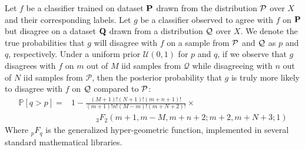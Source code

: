 \begin{theorem}
    \label{th:bayes-shift}
    Let $f$ be a classifier trained on dataset $\mathbf{P}$ drawn from the distribution $\mathcal{P}$ over $X$ and their corresponding labels.
    Let $g$ be a classifier observed to agree with $f$ on $\mathbf{P}$ but disagree on a dataset $\mathbf{Q}$ drawn from a distribution $\mathcal{Q}$ over $X$.
    We denote the true probabilities that $g$ will disagree with $f$ on a sample from $\mathcal{P}$ and $\mathcal{Q}$ as $p$ and $q$, respectively.
    Under a uniform prior $\mathcal{U}(0,1)$ for $p$ and $q$,
    if we observe that $g$ disagrees with $f$ on $m$ out of $M$ iid samples from $\mathcal{Q}$ while disagreeing with $n$ out of $N$ iid samples from $\mathcal{P}$, then
    the posterior probability that $g$ is truly more likely to disagree with $f$ on $\mathcal{Q}$ compared to $\mathcal{P}$:
    \begin{align}
        \mathbb{P}[q > p] = &1 -\frac{(M+1)! (N+1)! (m+n+1)!}{(m+1)! n! (M-m)! (m+N+2)!} \times \label{eq:hyper}\\
        &\quad\quad\quad  _3F_2(m+1,m-M,m+n+2;m+2,m+N+3;1) \nonumber
    \end{align}
    Where $_p{F}_q$ is the generalized hyper-geometric function, implemented in several standard mathematical libraries.
\end{theorem}
